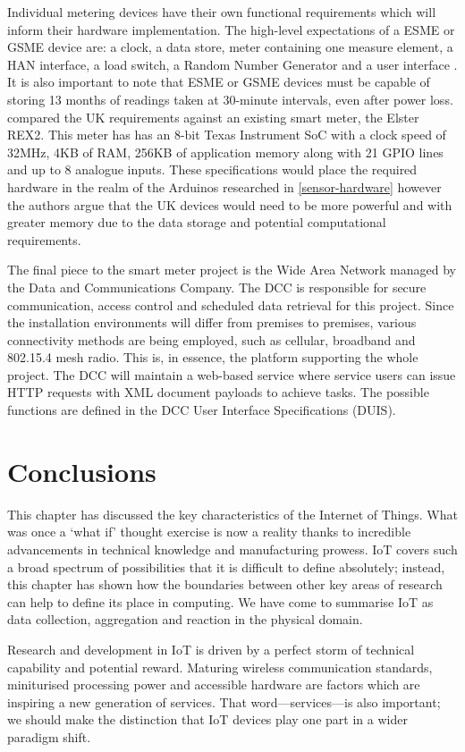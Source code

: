       Individual metering devices have their own functional requirements which will inform their hardware implementation. The high-level expectations of a ESME or GSME device are: a clock, a data store, meter containing one measure element, a HAN interface, a load switch, a Random Number Generator and a user interface \citep{smets:2014}. It is also important to note that ESME or GSME devices must be capable of storing 13 months of readings taken at 30-minute intervals, even after power loss. \citet{SMUK:2012} compared the UK requirements against an existing smart meter, the Elster REX2. This meter has has an 8-bit Texas Instrument SoC with a clock speed of 32MHz, 4KB of RAM, 256KB of application memory along with 21 GPIO lines and up to 8 analogue inputs. These specifications would place the required hardware in the realm of the Arduinos researched in \ref{sensor-hardware} however the authors argue that the UK devices would need to be more powerful and with greater memory due to the data storage and potential computational requirements.

      The final piece to the smart meter project is the Wide Area Network managed by the Data and Communications Company. The DCC is responsible for secure communication, access control and scheduled data retrieval for this project. Since the installation environments will differ from premises to premises, various connectivity methods are being employed, such as cellular, broadband and 802.15.4 mesh radio. This is, in essence, the platform supporting the whole project. The DCC will maintain a web-based service where service users can issue HTTP requests with XML document payloads to achieve tasks. The possible functions are defined in the DCC User Interface Specifications (DUIS).

  \section{Conclusions}
    This chapter has discussed the key characteristics of the Internet of Things. What was once a `what if' thought exercise is now a reality thanks to incredible advancements in technical knowledge and manufacturing prowess. IoT covers such a broad spectrum of possibilities that it is difficult to define absolutely; instead, this chapter has shown how the boundaries between other key areas of research can help to define its place in computing. We have come to summarise IoT as data collection, aggregation and reaction in the physical domain.

    Research and development in IoT is driven by a perfect storm of technical capability and potential reward. Maturing wireless communication standards, miniturised processing power and accessible hardware are factors which are inspiring a new generation of services. That word---services---is also important; we should make the distinction that IoT devices play one part in a wider paradigm shift.

